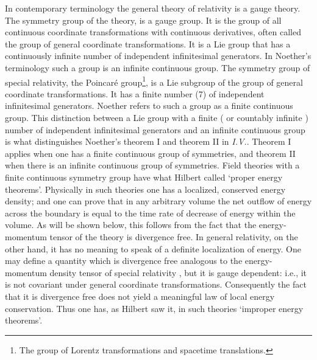 In contemporary terminology the general theory of relativity is a gauge theory.
The symmetry group of the theory, is a gauge group. It is the group of all continuous coordinate 
transformations with continuous derivatives,   often called
the group of general coordinate transformations. 
   It is a Lie group that has a continuously infinite number of independent infinitesimal generators. In Noether's terminology  such a group is an infinite continuous group.
The symmetry group of special relativity,  the Poincar\'{e} group\footnote{
The group of Lorentz transformations and spacetime translations.}, 
 is a Lie subgroup of the group of general coordinate transformations.  It
 has a finite number (7) of independent infinitesimal
generators. Noether refers to such a  group as a finite continuous group.
This distinction between a Lie group with a finite ( or countably infinite ) number of independent infinitesimal generators and an infinite continuous
group is what distinguishes Noether's theorem I and theorem II  in {\it{I.V.}}.
Theorem I applies when one has a finite continuous  group of symmetries,
and theorem II  when there is an infinite continuous group of
symmetries. Field theories with a finite continuous symmetry group have what
Hilbert called `proper energy theorems'. Physically in such
theories one has a localized, conserved energy density; and 
one can prove that in any arbitrary volume the net outflow of energy 
across the boundary is
equal to the time rate of decrease of energy within the volume. As will
be shown below, this follows from the fact that the energy-momentum tensor
of the theory is divergence free. In general relativity,
on the other hand, it has no meaning to speak of a definite localization of
energy.   One may define a quantity which is divergence free analogous to the energy-momentum density tensor of special relativity , but it  is gauge dependent: i.e., it is not covariant under general coordinate transformations. 
Consequently the fact that it
is divergence free does not yield a meaningful law of local energy conservation.
Thus one has, as Hilbert saw it, in such theories `improper
energy theorems'.

